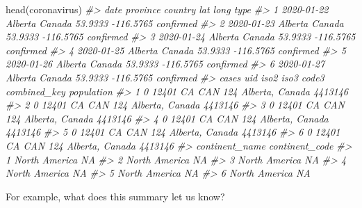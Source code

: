 \documentclass[
]{book}
\newenvironment{Shaded}{\begin{snugshade}}{\end{snugshade}}
\newcommand{\CommentTok}[1]{\textcolor[rgb]{0.56,0.35,0.01}{\textit{#1}}}
\newcommand{\FunctionTok}[1]{\textcolor[rgb]{0.00,0.00,0.00}{#1}}
\newcommand{\NormalTok}[1]{#1}
\newcommand{\SpecialCharTok}[1]{\textcolor[rgb]{0.00,0.00,0.00}{#1}}
\begin{document}
\begin{Shaded}
\begin{Highlighting}[]
\FunctionTok{head}\NormalTok{(coronavirus)}
\CommentTok{\#\textgreater{}         date province country     lat      long      type}
\CommentTok{\#\textgreater{} 1 2020{-}01{-}22  Alberta  Canada 53.9333 {-}116.5765 confirmed}
\CommentTok{\#\textgreater{} 2 2020{-}01{-}23  Alberta  Canada 53.9333 {-}116.5765 confirmed}
\CommentTok{\#\textgreater{} 3 2020{-}01{-}24  Alberta  Canada 53.9333 {-}116.5765 confirmed}
\CommentTok{\#\textgreater{} 4 2020{-}01{-}25  Alberta  Canada 53.9333 {-}116.5765 confirmed}
\CommentTok{\#\textgreater{} 5 2020{-}01{-}26  Alberta  Canada 53.9333 {-}116.5765 confirmed}
\CommentTok{\#\textgreater{} 6 2020{-}01{-}27  Alberta  Canada 53.9333 {-}116.5765 confirmed}
\CommentTok{\#\textgreater{}   cases   uid iso2 iso3 code3    combined\_key population}
\CommentTok{\#\textgreater{} 1     0 12401   CA  CAN   124 Alberta, Canada    4413146}
\CommentTok{\#\textgreater{} 2     0 12401   CA  CAN   124 Alberta, Canada    4413146}
\CommentTok{\#\textgreater{} 3     0 12401   CA  CAN   124 Alberta, Canada    4413146}
\CommentTok{\#\textgreater{} 4     0 12401   CA  CAN   124 Alberta, Canada    4413146}
\CommentTok{\#\textgreater{} 5     0 12401   CA  CAN   124 Alberta, Canada    4413146}
\CommentTok{\#\textgreater{} 6     0 12401   CA  CAN   124 Alberta, Canada    4413146}
\CommentTok{\#\textgreater{}   continent\_name continent\_code}
\CommentTok{\#\textgreater{} 1  North America             NA}
\CommentTok{\#\textgreater{} 2  North America             NA}
\CommentTok{\#\textgreater{} 3  North America             NA}
\CommentTok{\#\textgreater{} 4  North America             NA}
\CommentTok{\#\textgreater{} 5  North America             NA}
\CommentTok{\#\textgreater{} 6  North America             NA}
\end{Highlighting}
\end{Shaded}

For example, what does this summary let us know?

\begin{Shaded}
\end{Shaded}
\end{document}

